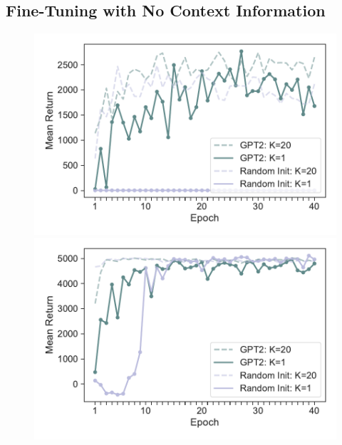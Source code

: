 \documentclass{article}
\begin{document}
\subsection{Fine-Tuning with No Context Information}
\label{apendx:results-for-other-conditions-fine-tuning-with-no-context-information}

\begin{figure}[H]
    \centering
    \begin{minipage}[b]{0.32\linewidth}
        \includegraphics[width=\linewidth]{figs/returnmean_gpt2_dt_K1_hopper_medium_42.pdf}
    \end{minipage}
    \begin{minipage}[b]{0.32\linewidth}
        \includegraphics[width=\linewidth]{figs/returnmean_gpt2_dt_K1_halfcheetah_medium_42.pdf}
    \end{minipage}

\end{figure}
\end{document}
